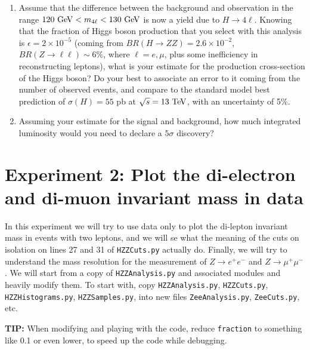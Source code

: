 \begin{enumerate}[resume]

\item Assume that the difference between the background and observation in the range  $120\ \text{Ge\kern -0.1em V} < m_{4\ell} < 130\ \text{Ge\kern -0.1em V}$ is now a yield due to $H \rightarrow 4\ell$. Knowing that the fraction of Higgs boson production that you select with this analysis is $\epsilon = 2 \times 10^{-5}$ (coming from $BR(H\rightarrow ZZ)=2.6\times 10^{-2}$, $BR(Z\rightarrow \ell\ell) \sim 6\%$, where $\ell = e, \mu$, plus some inefficiency in reconstructing leptons), what is your estimate for the production cross-section of the Higgs boson? Do your best to associate an error to it coming from the number of observed events, and compare to the standard model best prediction of $\sigma(H) = 55$ pb at $\sqrt{s} = 13\ \text{Te\kern -0.1em V}$, with an uncertainty of 5\%. 
\item Assuming your estimate for the signal and background, how much integrated luminosity would you need to declare a $5\sigma$ discovery?
\end{enumerate}

\section{Experiment 2: Plot the di-electron and di-muon invariant mass in data}

In this experiment we will try to use data only to plot the di-lepton invariant mass in events with two leptons, and we will se what the meaning of the cuts on isolation on lines 27 and 31 of \verb|HZZCuts.py| actually do. Finally, we will try to understand the mass resolution for the measurement of $Z\rightarrow e^+e^-$ and $Z\rightarrow \mu^+\mu^-$. We will start from a copy of \verb|HZZAnalysis.py| and associated modules and heavily modify them. To start with, copy \verb|HZZAnalysis.py|, \verb|HZZCuts.py|, \verb|HZZHistograms.py|, \verb|HZZSamples.py|, into new files \verb|ZeeAnalysis.py|, \verb|ZeeCuts.py|, etc. 

\begin{remark}
\textbf{TIP:} When modifying and playing with the code, reduce \verb|fraction| to something like 0.1 or even lower, to speed up the code while debugging.
\end{remark}


